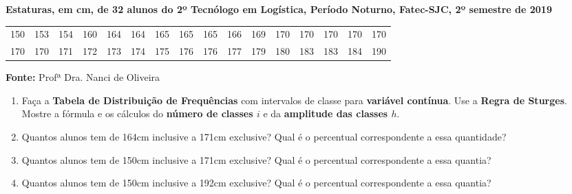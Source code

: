 \documentclass{jhwhw}
\begin{document}
\newpage
{}
\begin{center}
    \textbf{Estaturas, em cm, de 32 alunos do 2º Tecnólogo em Logística, Período Noturno, Fatec-SJC, 2º semestre de 2019}\\
    \begin{tabular}{llllllllllllllll}
        \hline
        150 & 153 & 154 & 160 & 164 & 164 & 165 & 165 & 165 & 166 & 169 & 170 & 170 & 170 & 170 & 170 \\
        170 & 170 & 171 & 172 & 173 & 174 & 175 & 176 & 176 & 177 & 179 & 180 & 183 & 183 & 184 & 190 \\
        \hline
    \end{tabular}
    \textbf{Fonte:} Profª Dra. Nanci de Oliveira
\end{center}
\begin{enumerate}[label=\alph*)]
    \item Faça a \textbf{Tabela de Distribuição de Frequências} com intervalos de classe para \textbf{variável contínua}. Use a \textbf{Regra de Sturges}. Mostre a fórmula e os cálculos do \textbf{número de classes $i$} e da \textbf{amplitude das classes $h$}.
    \item Quantos alunos tem de 164cm inclusive a 171cm exclusive? Qual é o percentual correspondente a essa quantidade?
    \item Quantos alunos tem de 150cm inclusive a 171cm exclusive? Qual é o percentual correspondente a essa quantia?
    \item Quantos alunos tem de 150cm inclusive a 192cm exclusive? Qual é o percentual correspondente a essa quantia?
\end{enumerate}
\end{document}
